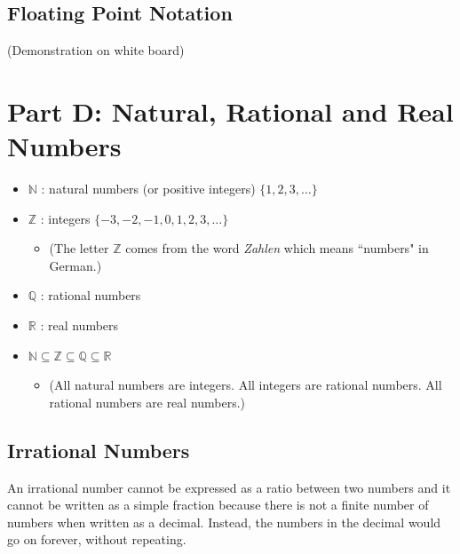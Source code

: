 \documentclass[]{report}
\begin{document}
\begin{enumerate}


\subsection*{Floating Point Notation}
(Demonstration on white board)






\section*{Part D: Natural, Rational and Real Numbers}
\begin{itemize}
\item $\mathbb{N}$ : natural numbers (or positive integers) $\{1,2,3,\ldots\}$
\item $\mathbb{Z}$ : integers $\{-3,-2,-1,0,1,2,3,\ldots\}$
\begin{itemize}
\item (The letter $\mathbb{Z}$ comes from the word \emph{Zahlen} which means ``numbers" in German.)
\end{itemize}
\item $\mathbb{Q}$ : rational numbers
\item $\mathbb{R}$ : real numbers
\item $\mathbb{N} \subseteq \mathbb{Z } \subseteq \mathbb{Q} \subseteq \mathbb{R}$
\begin{itemize}
\item (All natural numbers are integers. All integers are rational numbers. All rational numbers are real numbers.)
\end{itemize}
\end{itemize}




\subsection{Irrational Numbers}
An irrational number cannot be expressed as a ratio between two numbers and it cannot be written as a simple fraction because there is not a finite number of numbers when written as a decimal. Instead, the numbers in the decimal would go on forever, without repeating.




\end{enumerate}
\end{document}
